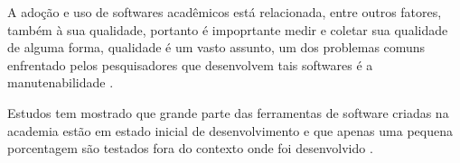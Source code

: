 
A adoção e uso de softwares acadêmicos está relacionada, entre outros fatores,
também à sua qualidade, portanto é impoprtante medir e coletar sua qualidade de
alguma forma, qualidade é um vasto assunto, um dos problemas comuns enfrentado
pelos pesquisadores que desenvolvem tais softwares é a manutenabilidade
\cite{Prlic2012}.

Estudos tem mostrado que grande parte das ferramentas de software criadas na
academia estão em estado inicial de desenvolvimento \cite{marshall2013tools} e
que apenas uma pequena porcentagem são testados fora do contexto onde foi
desenvolvido \cite{Portillo12}.





%

